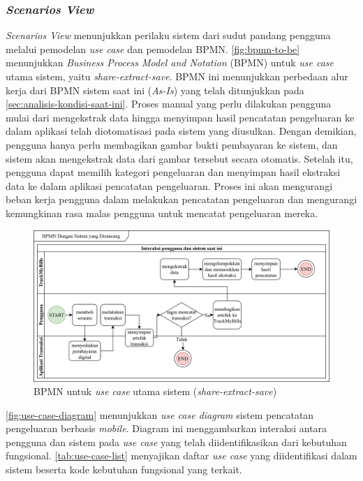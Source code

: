 \subsubsection{\emph{Scenarios View}}
\label{subsubsec:use-case-view}

\emph{Scenarios View} menunjukkan perilaku sistem dari sudut pandang pengguna melalui pemodelan \emph{use case} dan pemodelan BPMN. \autoref{fig:bpmn-to-be} menunjukkan \emph{Business Process Model and Notation} (BPMN) untuk \emph{use case} utama sistem, yaitu \emph{share-extract-save}. BPMN ini menunjukkan perbedaan alur kerja dari BPMN sistem saat ini (\emph{As-Is}) yang telah ditunjukkan pada \autoref{sec:analisis-kondisi-saat-ini}. Proses manual yang perlu dilakukan pengguna mulai dari mengekstrak data hingga menyimpan hasil pencatatan pengeluaran ke dalam aplikasi telah diotomatisasi pada sistem yang diusulkan. Dengan demikian, pengguna hanya perlu membagikan gambar bukti pembayaran ke sistem, dan sistem akan mengekstrak data dari gambar tersebut secara otomatis. Setelah itu, pengguna dapat memilih kategori pengeluaran dan menyimpan hasil ekstraksi data ke dalam aplikasi pencatatan pengeluaran. Proses ini akan mengurangi beban kerja pengguna dalam melakukan pencatatan pengeluaran dan mengurangi kemungkinan rasa malas pengguna untuk mencatat pengeluaran mereka.

\begin{figure}[htbp]
    \centering
    \includegraphics[width=1\textwidth]{images/To-be.png}
    \caption{BPMN untuk \emph{use case} utama sistem (\emph{share-extract-save})}
    \label{fig:bpmn-to-be}
\end{figure}

\autoref{fig:use-case-diagram} menunjukkan \emph{use case diagram} sistem pencatatan pengeluaran berbasis \emph{mobile}. Diagram ini menggambarkan interaksi antara pengguna dan sistem pada \emph{use case} yang telah diidentifikasikan dari kebutuhan fungsional. \autoref{tab:use-case-list} menyajikan daftar \emph{use case} yang diidentifikasi dalam sistem beserta kode kebutuhan fungsional yang terkait. 

